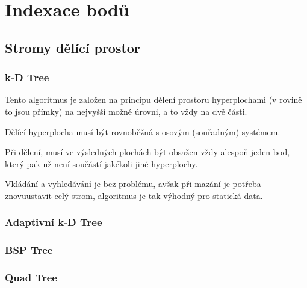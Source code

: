 
\section{Indexace bodů}

\subsection{Stromy dělící prostor}

\subsubsection{k-D Tree}

\begin{compactitem}
    \item Tento algoritmus je založen na principu dělení prostoru hyperplochami (v rovině to jsou přímky) na nejvyšší možné úrovni, a to vždy na dvě části.

    \item Dělící hyperplocha musí být rovnoběžná s osovým (souřadným) systémem.

    \item Při dělení, musí ve výsledných plochách být obsažen vždy alespoň jeden bod, který pak už není součástí jakékoli jiné hyperplochy.

    \item Vkládání a vyhledávání je bez problému, avšak při mazání je potřeba znovuustavit celý strom, algoritmus je tak výhodný pro statická data.
\end{compactitem}



\subsubsection{Adaptivní k-D Tree}


\subsubsection{BSP Tree}


\subsubsection{Quad Tree}

